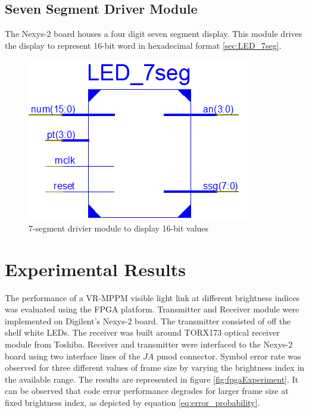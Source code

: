 \subsection{Seven Segment Driver Module} The Nexys-2 board houses a four digit seven segment display. This module drives the display to represent 16-bit word in hexadecimal format \ref{sec:LED_7seg}.

\begin{figure}[!htbp]
	\centering
	\includegraphics[width=.5\textwidth]{./Figures/LED_7seg.png}
	\caption{7-segment drivier module to display 16-bit values }
	\label{fig:LED_7seg}
\end{figure}

\section{Experimental Results}

The performance of a VR-MPPM visible light link at different brightness indices was evaluated using the FPGA platform. Transmitter and Receiver module were implemented on Digilent's Nexys-2 board. The transmitter consisted of off the shelf white LEDs. The receiver was built around TORX173 optical receiver module from Toshiba. Receiver and transmitter were interfaced to the Nexys-2 board using two interface lines of the $JA$ pmod connector. Symbol error rate was observed for three different values of frame size by varying the brightness index in the available range. The results are represented in figure \ref{fig:fpgaExperiment}. It can be observed that code error performance degrades for larger frame size at fixed brightness index, as depicted by equation \ref{eq:error_probability}.

